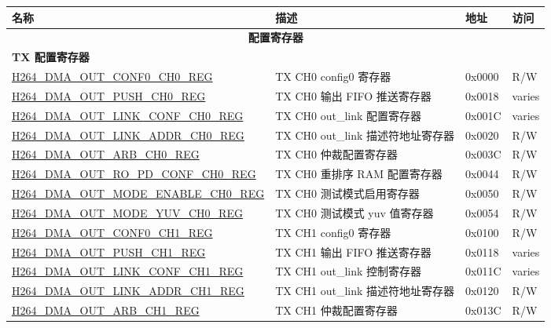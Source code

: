 \begin{longtable}{ | p{7.5cm} | p{5.7cm} | p{1.2cm} | p{1.5cm} | }
    \hline\rowcolor{lightgray}
    {\bfseries 名称} & {\bfseries 描述} &  {\bfseries 地址} & {\bfseries 访问} \\ \hline
    \endhead
    \multicolumn{4}{|c|}{\cellcolor{gray!15}\textbf{配置寄存器}} \\ \hline
    \multicolumn{4}{|l|}{\textbf{TX 配置寄存器}} \\ \hline
    \hyperref[regdesc:H264DMAOUTCONF0CH0REG]{H264\_DMA\_OUT\_CONF0\_CH0\_REG} & TX CH0 config0 寄存器 & 0x0000 & R/W \\ \hline
    \hyperref[regdesc:H264DMAOUTPUSHCH0REG]{H264\_DMA\_OUT\_PUSH\_CH0\_REG} &  TX CH0 输出 FIFO 推送寄存器 & 0x0018 & varies \\ \hline
    \hyperref[regdesc:H264DMAOUTLINKCONFCH0REG]{H264\_DMA\_OUT\_LINK\_CONF\_CH0\_REG} & TX CH0 out\_link 配置寄存器 & 0x001C & varies \\ \hline
    \hyperref[regdesc:H264DMAOUTLINKADDRCH0REG]{H264\_DMA\_OUT\_LINK\_ADDR\_CH0\_REG} & TX CH0 out\_link 描述符地址寄存器 & 0x0020 & R/W \\ \hline
    \hyperref[regdesc:H264DMAOUTARBCH0REG]{H264\_DMA\_OUT\_ARB\_CH0\_REG} & TX CH0 仲裁配置寄存器 & 0x003C & R/W \\ \hline
    \hyperref[regdesc:H264DMAOUTROPDCONFCH0REG]{H264\_DMA\_OUT\_RO\_PD\_CONF\_CH0\_REG} & TX CH0 重排序 RAM 配置寄存器 & 0x0044 & R/W \\ \hline
    \hyperref[regdesc:H264DMAOUTMODEENABLECH0REG]{H264\_DMA\_OUT\_MODE\_ENABLE\_CH0\_REG} & TX CH0 测试模式启用寄存器 & 0x0050 & R/W \\ \hline
    \hyperref[regdesc:H264DMAOUTMODEYUVCH0REG]{H264\_DMA\_OUT\_MODE\_YUV\_CH0\_REG} & TX CH0 测试模式 yuv 值寄存器 & 0x0054 & R/W \\ \hline

    \hyperref[regdesc:H264DMAOUTCONF0CH1REG]{H264\_DMA\_OUT\_CONF0\_CH1\_REG} & TX CH1 config0 寄存器 & 0x0100 & R/W \\ \hline
    \hyperref[regdesc:H264DMAOUTPUSHCH1REG]{H264\_DMA\_OUT\_PUSH\_CH1\_REG} & TX CH1 输出 FIFO 推送寄存器 & 0x0118 & varies \\ \hline
    \hyperref[regdesc:H264DMAOUTLINKCONFCH1REG]{H264\_DMA\_OUT\_LINK\_CONF\_CH1\_REG} & TX CH1 out\_link 控制寄存器 & 0x011C & varies \\ \hline
    \hyperref[regdesc:H264DMAOUTLINKADDRCH1REG]{H264\_DMA\_OUT\_LINK\_ADDR\_CH1\_REG} & TX CH1 out\_link 描述符地址寄存器 & 0x0120 & R/W \\ \hline
    \hyperref[regdesc:H264DMAOUTARBCH1REG]{H264\_DMA\_OUT\_ARB\_CH1\_REG} & TX CH1 仲裁配置寄存器 & 0x013C & R/W \\ \hline


\end{longtable}
